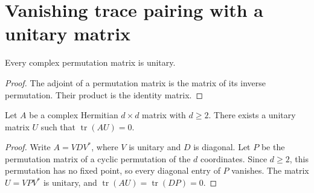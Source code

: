 \section{Vanishing trace pairing with a unitary matrix}

\begin{theorem}
    \label{thm:permutation_matrix_unitary}
    \leanok
    Every complex permutation matrix is unitary.
\end{theorem}

\begin{proof}
    \leanok
    The adjoint of a permutation matrix is the matrix of its inverse permutation.
    Their product is the identity matrix.
\end{proof}

\begin{theorem}
    \label{thm:hermitian_unitary_trace_pairing_zero}
    \leanok
    Let $A$ be a complex Hermitian $d\times d$ matrix with $d\ge2$.
    There exists a unitary matrix $U$ such that $\operatorname{tr}(AU)=0$.
\end{theorem}

\begin{proof}
    \leanok
    Write $A=VDV^*$, where $V$ is unitary and $D$ is diagonal.
    Let $P$ be the permutation matrix of a cyclic permutation of the $d$
    coordinates. Since $d\ge2$, this permutation has no fixed point, so every
    diagonal entry of $P$ vanishes. The matrix $U=VPV^*$ is unitary, and
    $\operatorname{tr}(AU)=\operatorname{tr}(DP)=0$.
\end{proof}
